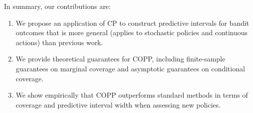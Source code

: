 In summary, our contributions are: 
\begin{enumerate}[label=(\roman*)]
  \item We propose an application of CP to construct predictive intervals for bandit outcomes that is more general (applies to stochastic policies and continuous actions) than previous work.
  \item We provide theoretical guarantees for COPP, including finite-sample guarantees on marginal coverage and asymptotic guarantees on conditional coverage.
  \item We show empirically that COPP outperforms standard methods in terms of coverage and predictive interval width when assessing new policies. 
\end{enumerate}

